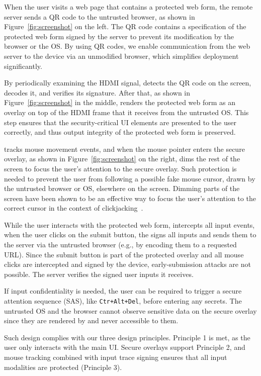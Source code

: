 When the user visits a web page that contains a protected web form, the remote server sends a QR code to the untrusted browser, as shown in Figure~\ref{fig:screenshot} on the left. The QR code contains a specification of the protected web form signed by the server to prevent its modification by the browser or the OS. By using QR codes, we enable communication from the web server to the \hub device via an unmodified browser, which simplifies deployment significantly.

By periodically examining the HDMI signal, \hub detects the QR code on the screen, decodes it, and verifies its signature. After that, as shown in Figure~\ref{fig:screenshot} in the middle, \hub renders the protected web form as an overlay on top of the HDMI frame that it receives from the untrusted OS. This step ensures that the security-critical UI elements are presented to the user correctly, and thus output integrity of the protected web form is preserved.

\hub tracks mouse movement events, and when the mouse pointer enters the secure overlay, as shown in Figure~\ref{fig:screenshot} on the right, \hub dims the rest of the screen to focus the user's attention to the secure overlay. Such protection is needed to prevent the user from following a possible fake mouse cursor, drawn by the untrusted browser or OS, elsewhere on the screen. Dimming parts of the screen have been shown to be an effective way to focus the user's attention to the correct cursor in the context of clickjacking~\cite{huang2012clickjacking}.

While the user interacts with the protected web form, \hub intercepts all input events, when the user clicks on the submit button, the \hub signs all inputs and sends them to the server via the untrusted browser (e.g., by encoding them to a requested URL). Since the submit button is part of the protected overlay and all mouse clicks are intercepted and signed by the \hub device, early-submission attacks are not possible. The server verifies the signed user inputs it receives. 

If input confidentiality is needed, the user can be required to trigger a secure attention sequence (SAS), like \texttt{Ctr+Alt+Del}, before entering any secrets. The untrusted OS and the browser cannot observe sensitive data on the secure overlay since they are rendered by \hub and never accessible to them.

Such design complies with our three design principles. Principle 1 is met, as the user only interacts with the main UI. Secure overlays support Principle 2, and mouse tracking combined with input trace signing ensures that all input modalities are protected (Principle 3).

